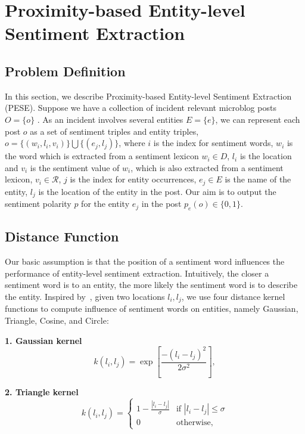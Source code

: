 \documentclass[runningheads]{llncs}
\begin{document}
\section{Proximity-based Entity-level Sentiment Extraction}\label{sec:sentiment classification}


\subsection{Problem Definition}
In this section, we describe Proximity-based Entity-level Sentiment Extraction (PESE). Suppose we have a collection of incident relevant microblog posts $O=\{o\}$ . As an incident involves several entities $E=\{e\}$, we can represent each post $o$ as a set of sentiment triples and entity triples, $o=\{(w_i,l_i,v_i)\}\bigcup \{(e_j,l_j)\}$, where $i$ is the index for sentiment words, $w_i$ is the word which is extracted from a sentiment lexicon $w_i\in D$,  $l_i$  is the location and $v_i$ is the sentiment value of $w_i$, which is also extracted from a sentiment lexicon, $v_i \in \mathcal{R}$,  $j$ is the index for entity occurrences, $e_j\in E$ is the name of the entity, $l_j$ is the location of the entity in the post. Our aim is to output the sentiment polarity $p$ for the entity $e_j$ in the post $p_e(o)\in\{0,1\}$.

\subsection{Distance Function}

Our basic assumption is that the position of a sentiment word influences the performance of entity-level sentiment extraction. Intuitively, the closer a sentiment word is to an entity, the more likely the sentiment word is to describe the entity. Inspired by~\cite{Lv2009distancefunction}, given two locations $l_i,l_j$, we use four distance kernel functions to compute influence of sentiment words on entities, namely Gaussian, Triangle, Cosine, and Circle:

\textbf{1. Gaussian kernel}
\begin{equation}
    k(l_i,l_j) = \exp\left[\frac{-(l_i-l_j)^2}{2\sigma^2}\right],
\end{equation}

\textbf{2. Triangle kernel}
\begin{equation}
k(l_i,l_j)=\begin{cases}
1-\frac{|l_i-l_j|}{\sigma} &\mbox{if $|l_i-l_j|\leq \sigma$}\\
0 &\mbox{otherwise},
\end{cases}
\end{equation}
\end{document}
